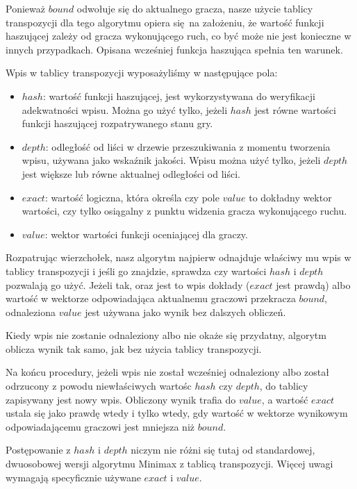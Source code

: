\documentclass{pracamgr}
\begin{document}
Ponieważ \(bound\) odwołuje się do aktualnego gracza, nasze użycie tablicy transpozycji dla tego algorytmu opiera się na założeniu, że wartość funkcji haszującej zależy od gracza wykonującego ruch, co być może nie jest konieczne w innych przypadkach.
Opisana wcześniej funkcja haszująca spełnia ten warunek.

Wpis w tablicy transpozycji wyposażyliśmy w następujące pola:

\begin{itemize}
\item{\(hash\): wartość funkcji haszującej, jest wykorzystywana do weryfikacji adekwatności wpisu. Można go użyć tylko, jeżeli \(hash\) jest równe wartości funkcji haszującej rozpatrywanego stanu gry.}
\item{\(depth\): odległość od liści w drzewie przeszukiwania z momentu tworzenia wpisu, używana jako wskaźnik jakości. Wpisu można użyć tylko, jeżeli \(depth\) jest większe lub równe aktualnej odległości od liści.}
\item{\(exact\): wartość logiczna, która określa czy pole \(value\) to dokładny wektor wartości, czy tylko osiągalny z punktu widzenia gracza wykonującego ruchu.}
\item{\(value\): wektor wartości funkcji oceniającej dla graczy.}
\end{itemize}

Rozpatrując wierzchołek, nasz algorytm najpierw odnajduje właściwy mu wpis w tablicy transpozycji i jeśli go znajdzie, sprawdza czy wartości \(hash\) i \(depth\) pozwalają go użyć.
Jeżeli tak, oraz jest to wpis dokłady (\(exact\) jest prawdą) albo wartość w wektorze odpowiadająca aktualnemu graczowi przekracza \(bound\), odnaleziona \(value\) jest używana jako wynik bez dalszych obliczeń.

Kiedy wpis nie zostanie odnaleziony albo nie okaże się przydatny, algorytm oblicza wynik tak samo, jak bez użycia tablicy transpozycji.

Na końcu procedury, jeżeli wpis nie został wcześniej odnaleziony albo został odrzucony z powodu niewłaściwych wartośc \(hash\) czy \(depth\), do tablicy zapisywany jest nowy wpis.
Obliczony wynik trafia do \(value\), a wartość \(exact\) ustala się jako prawdę wtedy i tylko wtedy, gdy wartość w wektorze wynikowym odpowiadającemu graczowi jest mniejsza niż \(bound\).

Postępowanie z \(hash\) i \(depth\) niczym nie różni się tutaj od standardowej, dwuosobowej wersji algorytmu Minimax z tablicą transpozycji.
Więcej uwagi wymagają specyficznie używane \(exact\) i \(value\).
\end{document}
